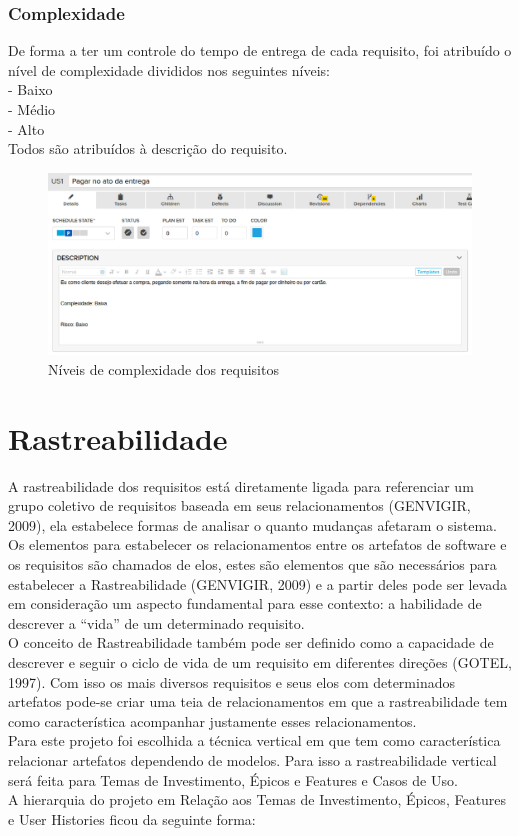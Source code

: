 \subsubsection{Complexidade}

De forma a ter um controle do tempo de entrega de cada requisito, foi atribuído o nível de complexidade divididos nos seguintes níveis:\\
\tab - Baixo\\
\tab - Médio\\
\tab - Alto\\
Todos são atribuídos à descrição do requisito.\\


\begin{figure}[h]
    \centering
    \label{fig01}
        \includegraphics[keepaspectratio=true,scale=0.4]{figuras/RallyDev/risco.eps}
    \caption{Níveis de complexidade dos requisitos}
\end{figure}


\section{Rastreabilidade}

A rastreabilidade dos requisitos está diretamente ligada para referenciar um grupo coletivo de requisitos baseada em seus relacionamentos (GENVIGIR, 2009), ela estabelece formas de analisar o quanto mudanças afetaram o sistema.
\tab Os elementos para estabelecer os relacionamentos entre os artefatos de software e os requisitos são chamados de elos, estes são elementos que são necessários para estabelecer a Rastreabilidade (GENVIGIR, 2009) e a partir deles pode ser levada em consideração um aspecto fundamental para esse contexto: a habilidade de descrever a “vida” de um determinado requisito. \\
\tab O conceito de Rastreabilidade também pode ser definido como a capacidade de descrever e seguir o ciclo de vida de um requisito em diferentes direções (GOTEL, 1997). Com isso os mais diversos requisitos e seus elos com determinados artefatos pode-se criar uma teia de relacionamentos em que a rastreabilidade tem como característica acompanhar justamente esses relacionamentos.\\
\tab Para este projeto foi escolhida a técnica vertical em que tem como característica relacionar artefatos dependendo de modelos. Para isso a rastreabilidade vertical será feita para Temas de Investimento, Épicos e Features e Casos de Uso.\\
\tab A hierarquia do projeto em Relação aos Temas de Investimento, Épicos, Features e User Histories ficou da seguinte forma:\\

